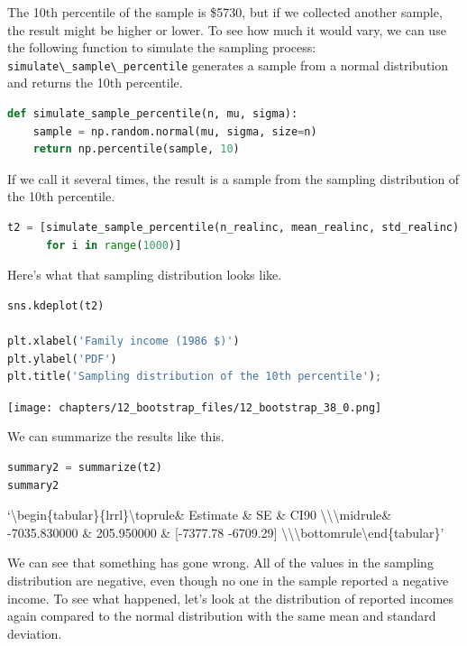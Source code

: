 The 10th percentile of the sample is \$5730, but if we collected another
sample, the result might be higher or lower. To see how much it would
vary, we can use the following function to simulate the sampling
process: \passthrough{\lstinline!simulate\_sample\_percentile!}
generates a sample from a normal distribution and returns the 10th
percentile.

\begin{lstlisting}[language=Python,style=source]
def simulate_sample_percentile(n, mu, sigma):
    sample = np.random.normal(mu, sigma, size=n)
    return np.percentile(sample, 10)
\end{lstlisting}

If we call it several times, the result is a sample from the sampling
distribution of the 10th percentile.

\begin{lstlisting}[language=Python,style=source]
t2 = [simulate_sample_percentile(n_realinc, mean_realinc, std_realinc)
      for i in range(1000)]
\end{lstlisting}

Here's what that sampling distribution looks like.

\begin{lstlisting}[language=Python,style=source]
sns.kdeplot(t2)

plt.xlabel('Family income (1986 $)')
plt.ylabel('PDF')
plt.title('Sampling distribution of the 10th percentile');
\end{lstlisting}

\begin{center}
\texttt{[image: chapters/12\_bootstrap\_files/12\_bootstrap\_38\_0.png]}
\end{center}

We can summarize the results like this.

\begin{lstlisting}[language=Python,style=source]
summary2 = summarize(t2)
summary2
\end{lstlisting}

`\textbackslash begin\{tabular\}\{lrrl\}\n\textbackslash toprule\n \&
Estimate \& SE \& CI90
\textbackslash\textbackslash{}\n\textbackslash midrule\n \& -7035.830000
\& 205.950000 \& {[}-7377.78 -6709.29{]}
\textbackslash\textbackslash{}\n\textbackslash bottomrule\n\textbackslash end\{tabular\}\n'

We can see that something has gone wrong. All of the values in the
sampling distribution are negative, even though no one in the sample
reported a negative income. To see what happened, let's look at the
distribution of reported incomes again compared to the normal
distribution with the same mean and standard deviation.

